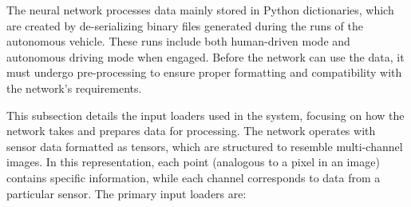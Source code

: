 The neural network processes data mainly stored in Python dictionaries, which are created by de-serializing binary files generated during the runs of the autonomous vehicle. These runs include both human-driven mode and autonomous driving mode when engaged. Before the network can use the data, it must undergo pre-processing to ensure proper formatting and compatibility with the network's requirements.

This subsection details the input loaders used in the system, focusing on how the network takes and prepares data for processing. The network operates with sensor data formatted as tensors, which are structured to resemble multi-channel images. In this representation, each point (analogous to a pixel in an image) contains specific information, while each channel corresponds to data from a particular sensor. 
The primary input loaders are:
